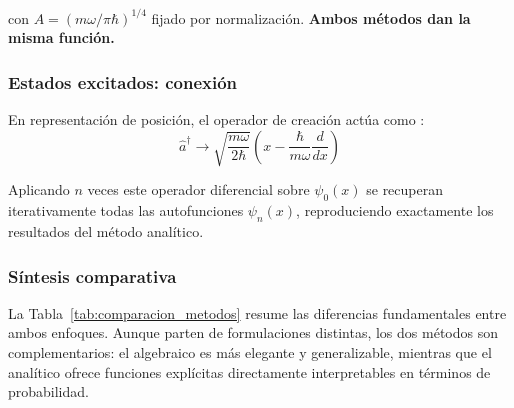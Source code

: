 con $A = (m\omega/\pi\hbar)^{1/4}$ fijado por normalización. \textbf{Ambos métodos dan la misma función.}

\subsubsection{Estados excitados: conexión}

En representación de posición, el operador de creación actúa como \cite{dirac1930}:
\vspace{-8pt}
\begin{equation}
	\hat{a}^\dagger \to \sqrt{\frac{m\omega}{2\hbar}}\left(x - \frac{\hbar}{m\omega}\frac{d}{dx}\right)
\end{equation}

Aplicando $n$ veces este operador diferencial sobre $\psi_0(x)$ se recuperan iterativamente todas las autofunciones $\psi_n(x)$, reproduciendo exactamente los resultados del método analítico.

\subsubsection{Síntesis comparativa}
La Tabla~\ref{tab:comparacion_metodos} resume las diferencias fundamentales entre ambos enfoques. Aunque parten de formulaciones distintas, los dos métodos son complementarios: el algebraico es más elegante y generalizable, mientras que el analítico ofrece funciones explícitas directamente interpretables en términos de probabilidad.\\

\begin{table}[h]
	\centering
	
    \caption[Comparación entre el método analítico (Schrödinger) y algebraico (Dirac).]{Comparación entre el método analítico (Schrödinger) y algebraico (Dirac). Fuente: elaboración propia}
    \label{tab:comparacion_metodos}
\end{table}


